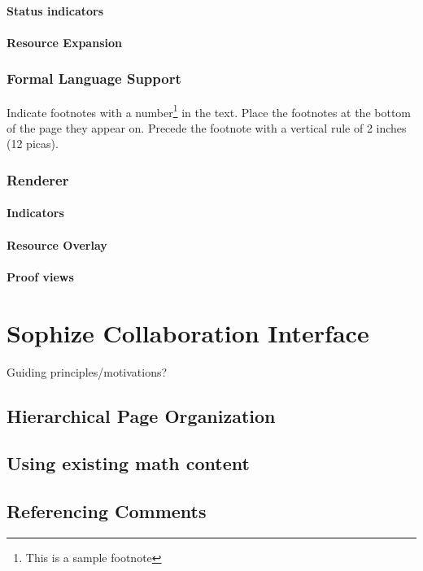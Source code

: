 \documentclass[a4paper]{article}
\begin{document}
\paragraph{Status indicators}


\paragraph{Resource Expansion}

\subsubsection{Formal Language Support}

Indicate footnotes with a number\footnote{This is a sample footnote} in
the text. Place the footnotes at the bottom of the page they appear on.
Precede the footnote with a vertical rule of 2 inches (12 picas).

\subsubsection{Renderer}
\paragraph{ Indicators }
\paragraph{ Resource Overlay }
\paragraph{ Proof views }

\section{Sophize Collaboration Interface}
Guiding principles/motivations?
\subsection{Hierarchical Page Organization}

\subsection{Using existing math content}

\subsection{Referencing Comments}
\end{document}
